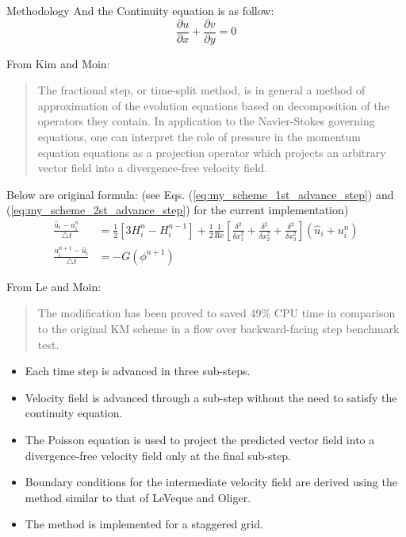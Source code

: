 \documentclass{beamer}
\newcommand{\timestep}{ \triangle t }
\newcommand{\ren}{ \text{Re} }
\begin{document}
\begin{frame}{Methodology}
	And the Continuity equation is as follow: 
	\begin{equation}
		\frac{\partial u}{\partial x} + \frac{\partial v}{\partial y} = 0
	\end{equation}
	
	\framebreak
	
	From Kim and Moin:
	\begin{quote}
		The fractional step, or time-split method, is in general a method of approximation of the evolution equations based on decomposition of the operators they contain. In application to the Navier-Stokes governing equations, one can interpret the role of pressure in the momentum equation equations as a projection operator which projects an arbitrary vector field into a divergence-free velocity field.
	\end{quote}
	
	Below are original formula: (see Eqs. (\ref{eq:my_scheme_1st_advance_step}) and (\ref{eq:my_scheme_2st_advance_step}) for the current implementation)
	\begin{align}
		\frac{\hat{u}_i - u_i^n}{\timestep} &= \frac{1}{2} \left[3 H_i^n - H_i^{n-1}\right] + \frac{1}{2} \frac{1}{\ren} \left[ \frac{\delta^2}{\delta x_1^2} + \frac{\delta^2}{\delta x_2^2} + \frac{\delta^2}{\delta x_3^2} \right] (\hat{u}_i + u_i^n) \\
		\frac{u_i^{n+1} -\hat{u}_i}{\timestep} &= -G(\phi^{n+1})
	\end{align}
	
	\framebreak
	
	From Le and Moin:
	\begin{quote}
		The modification has been proved to saved 49\% CPU time in comparison to the original KM scheme in a flow over backward-facing step benchmark test.
	\end{quote}
	
	\begin{itemize}
		\item Each time step is advanced in three sub-steps.
		\item Velocity field is advanced through a sub-step without the need to satisfy the continuity equation.
		\item The Poisson equation is used to project the predicted vector field into a divergence-free velocity field only at the final sub-step.
		\item Boundary conditions for the intermediate velocity field are derived using the method similar to that of LeVeque and Oliger.
		\item The method is implemented for a staggered grid.
	\end{itemize}
	

\end{frame}
\end{document}
